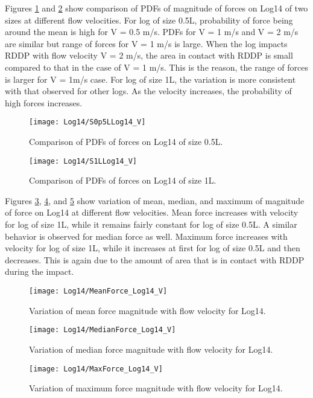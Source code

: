 \noindent Figures \ref{fig:S0p5LLog14_V} and \ref{fig:S1LLog14_V} show comparison of PDFs of magnitude of forces on Log14 of two sizes at different flow velocities. For log of size 0.5L, probability of force being around the mean is high for V = 0.5 m/s. PDFs for V = 1 m/s and V = 2 m/s are similar but range of forces for V = 1 m/s is large. When the log impacts RDDP with flow velocity V = 2 m/s, the area in contact with RDDP is small compared to that in the case of V = 1 m/s. This is the reason, the range of forces is larger for V = 1m/s case. For log of size 1L, the variation is more consistent with that observed for other logs. As the velocity increases, the probability of high forces increases.

\begin{figure}
\centering
\texttt{[image: Log14/S0p5LLog14\_V]}
\caption{\label{fig:S0p5LLog14_V}Comparison of PDFs of forces on Log14 of size 0.5L.}
\end{figure}
\begin{figure}
\centering
\texttt{[image: Log14/S1LLog14\_V]}
\caption{\label{fig:S1LLog14_V}Comparison of PDFs of forces on Log14 of size 1L.}
\end{figure}

\noindent Figures \ref{fig:MeanForce_Log14_V}, \ref{fig:MedianForce_Log14_V}, and \ref{fig:MaxForce_Log14_V} show variation of mean, median, and maximum of magnitude of force on Log14 at different flow velocities. Mean force increases with velocity for log of size 1L, while it remains fairly constant for log of size 0.5L. A similar behavior is observed for median force as well. Maximum force increases with velocity for log of size 1L, while it increases at first for log of size 0.5L and then decreases. This is again due to the amount of area that is in contact with RDDP during the impact. 

\begin{figure}
\centering
\texttt{[image: Log14/MeanForce\_Log14\_V]}
\caption{\label{fig:MeanForce_Log14_V}Variation of mean force magnitude with flow velocity for Log14.}
\end{figure}
\begin{figure}
\centering
\texttt{[image: Log14/MedianForce\_Log14\_V]}
\caption{\label{fig:MedianForce_Log14_V}Variation of median force magnitude with flow velocity for Log14.}
\end{figure}
\begin{figure}
\centering
\texttt{[image: Log14/MaxForce\_Log14\_V]}
\caption{\label{fig:MaxForce_Log14_V}Variation of maximum force magnitude with flow velocity for Log14.}
\end{figure}

